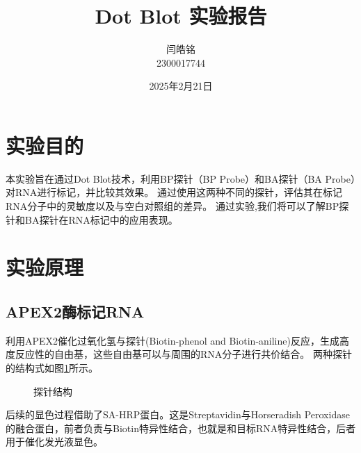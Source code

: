 \documentclass[UTF-8]{ctexart}
\title{Dot Blot 实验报告}
\author{闫皓铭\\ 2300017744}
\date{2025年2月21日}
\begin{document}
\maketitle
\section{实验目的}
本实验旨在通过Dot Blot技术，利用BP探针（BP Probe）和BA探针（BA Probe）对RNA进行标记，并比较其效果。
通过使用这两种不同的探针，评估其在标记RNA分子中的灵敏度以及与空白对照组的差异。
通过实验,我们将可以了解BP探针和BA探针在RNA标记中的应用表现。
\section{实验原理}
\subsection{APEX2酶标记RNA}
利用APEX2催化过氧化氢与探针(Biotin-phenol and Biotin-aniline)反应，生成高度反应性的自由基，这些自由基可以与周围的RNA分子进行共价结合。
两种探针的结构式如图\ref{探针结构}所示\cite{paper}。
 \begin{figure}[h]
    \centering
    \caption{探针结构\cite{paper}}  
    \label{探针结构}
 \end{figure}

 后续的显色过程借助了SA-HRP蛋白。这是Streptavidin与Horseradish Peroxidase的融合蛋白，前者负责与Biotin特异性结合，也就是和目标RNA特异性结合，后者用于催化发光液显色\cite{HP}。
\end{document}
